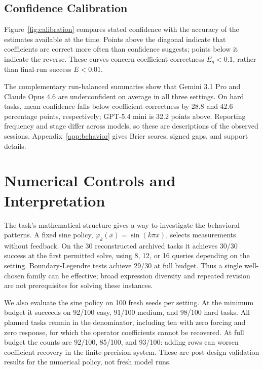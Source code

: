 \documentclass{article}
\begin{document}
\FloatBarrier
\subsection{Confidence Calibration}

Figure~\ref{fig:calibration} compares stated confidence with the accuracy of
the estimates available at the time. Points above the diagonal indicate that
coefficients are correct more often than confidence suggests; points below it
indicate the reverse. These curves concern coefficient correctness
\(E_q<0.1\), rather than final-run success \(E<0.01\).

The complementary run-balanced summaries show that Gemini 3.1 Pro and Claude
Opus 4.6 are underconfident on average in all three settings. On hard tasks,
mean confidence falls below coefficient correctness by 28.8 and 42.6 percentage
points, respectively; GPT-5.4 mini is 32.2 points above. Reporting frequency
and stage differ across models, so these are descriptions of the observed
sessions. Appendix~\ref{app:behavior} gives Brier scores, signed gaps, and
support details.

\section{Numerical Controls and Interpretation}
\label{sec:validation}

The task's mathematical structure gives a way to investigate the behavioral
patterns. A fixed sine policy, \(\varphi_k(x)=\sin(k\pi x)\), selects
measurements without feedback. On the 30 reconstructed archived tasks it
achieves 30/30 success at the first permitted solve, using 8, 12, or 16 queries
depending on the setting. Boundary-Legendre tests achieve 29/30 at full budget.
Thus a single well-chosen family can be effective; broad expression diversity
and repeated revision are not prerequisites for solving these instances.

We also evaluate the sine policy on 100 fresh seeds per setting. At the minimum
budget it succeeds on 92/100 easy, 91/100 medium, and 98/100 hard tasks.
All planned tasks remain in the denominator, including ten with zero forcing
and zero response, for which the operator coefficients cannot be recovered.
At full budget the counts are 92/100, 85/100, and 93/100: adding rows can
worsen coefficient recovery in the finite-precision system. These are
post-design validation results for the numerical policy, not fresh model runs.


\end{document}
